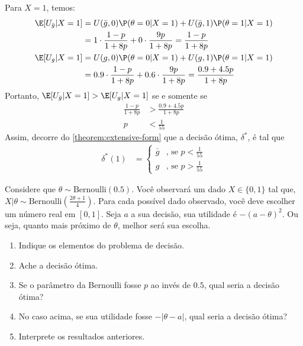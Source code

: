 { Para $X=1$, temos:
 \begin{align*}
  \E[U_{\bar{g}}|X=1]
  &= U(\bar{g},0)\P(\theta=0|X=1)
  +U(\bar{g},1)\P(\theta=1|X=1) \\
  &= 1 \cdot \frac{1-p}{1+8p} +0 \cdot \frac{9p}{1+8p}
  = \frac{1-p}{1+8p} \\
  \E[U_{g}|X=1]
  &= U(g,0)\P(\theta=0|X=1)
  +U(g,1)\P(\theta=1|X=1) \\
  &= 0.9 \cdot \frac{1-p}{1+8p}
  + 0.6 \cdot \frac{9p}{1+8p}
  = \frac{0.9+4.5p}{1+8p}							
 \end{align*}
 Portanto, $\E[U_{\bar{g}}|X=1] > \E[U_{g}|X=1]$
 se e somente se
 \begin{align*}
  \frac{1-p}{1+8p} &> \frac{0.9+4.5p}{1+8p}	\\
  p &< \frac{1}{55}
 \end{align*} 
 Assim, decorre do \cref{theorem:extensive-form} que 
 a decisão ótima, $\delta^{*}$, é tal que
 \begin{align*}
  \delta^{*}(1)	&=
  \begin{cases}
   \bar{g} & \text{, se $p < \frac{1}{55}$} \\
   g & \text{, se $p > \frac{1}{55}$}
  \end{cases}
 \end{align*}
}{}

\begin{exercise}
 Considere que $\theta \sim \text{Bernoulli}(0.5)$.
 Você observará um dado $X \in \{0,1\}$ tal que,
 $X|\theta \sim \text{Bernoulli}\left(\frac{2\theta+1}{4}\right)$.
 Para cada possível dado observado,
 você deve escolher um número real em $[0,1]$.
 Seja $a$ a sua decisão, sua utilidade é
 $-(a-\theta)^{2}$. Ou seja, quanto mais próximo de
 $\theta$, melhor será sua escolha.
 \begin{enumerate}[label=(\alph*)]
  \item Indique os elementos do problema de decisão.
  \item Ache a decisão ótima.
  \item Se o parâmetro da Bernoulli fosse
  $p$ ao invés de $0.5$, qual seria a decisão ótima?
  \item No caso acima, se sua utilidade fosse
  $-|\theta-a|$, qual seria a decisão ótima?
  \item Interprete os resultados anteriores.
 \end{enumerate}
\end{exercise}

